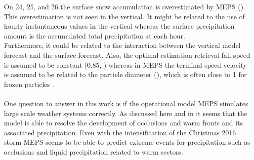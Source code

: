 On \num{24}, \num{25}, and \SI{26}{\dec} the surface snow accumulation is overestimated by MEPS (). This overestimation is not seen in the vertical. It might be related to the use of hourly instantaneous values in the vertical whereas the surface precipitation amount is the accumulated total precipitation at each hour. 
\\
Furthermore, it could be related to the interaction between the vertical model forecast and the surface forecast. Also, the optimal estimation retrieval fall speed is assumed to be constant (\SI{0.85}{\mPs}, ) whereas in MEPS the terminal speed velocity is assumed to be related to the particle diameter (), which is often close to \SI{1}{\mPs} for frozen particles \citep[personal communication,][]{Priv_Comm_Jenny}. 
\\
\\
One question to answer in this work is if the operational model MEPS simulates large scale weather systems correctly. As discussed here and in  it seems that the model is able to resolve the development of occlusions and warm fronts and its associated precipitation. Even with the intensification of the Christmas 2016 storm MEPS seems to be able to predict extreme events for precipitation such as occlusions and liquid precipitation related to warm sectors. %
